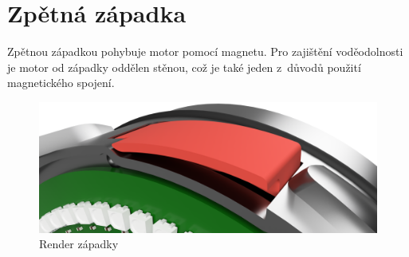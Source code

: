 \section{Zpětná západka}

Zpětnou západkou pohybuje motor pomocí magnetu. Pro zajištění vodě\-o\-dol\-nos\-ti je motor od západky oddělen stěnou, což je také jeden z~důvodů použití magne\-tic\-ké\-ho spojení.

\begin{figure}[h]
    \centering
    \includegraphics[width=\textwidth]{kapitoly/obrazky/E4/zapadka/render.png}
    \caption{Render západky}

    \label{fig:E4-zapadka}
\end{figure}

%   
%   


